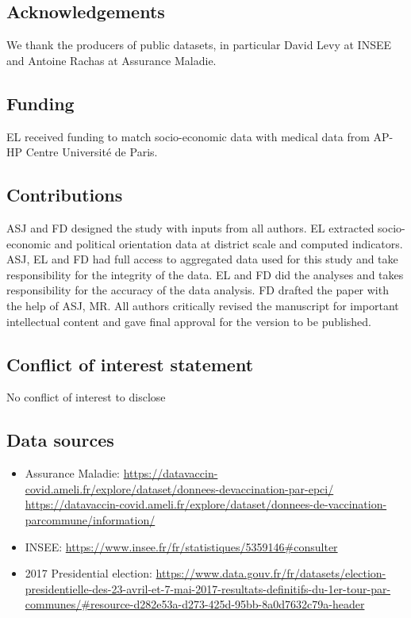 \documentclass[
]{article}
\providecommand{\tightlist}{%
  \setlength{\itemsep}{0pt}\setlength{\parskip}{0pt}}
\begin{document}
\hypertarget{acknowledgements}{%
\subsection{Acknowledgements}\label{acknowledgements}}

We thank the producers of public datasets, in particular David Levy at INSEE and Antoine Rachas at Assurance Maladie.

\hypertarget{funding}{%
\subsection{Funding}\label{funding}}

EL received funding to match socio-economic data with medical data from AP-HP Centre Université de Paris.

\hypertarget{contributions}{%
\subsection{Contributions}\label{contributions}}

ASJ and FD designed the study with inputs from all authors. EL extracted socio-economic and political orientation data at district scale and computed indicators. ASJ, EL and FD had full access to aggregated data used for this study and take responsibility for the integrity of the data. EL and FD did the analyses and takes responsibility for the accuracy of the data analysis. FD drafted the paper with the help of ASJ, MR. All authors critically revised the manuscript for important intellectual content and gave final approval for the version to be published.

\hypertarget{conflict-of-interest-statement}{%
\subsection{Conflict of interest statement}\label{conflict-of-interest-statement}}

No conflict of interest to disclose

\hypertarget{data-sources}{%
\subsection{Data sources}\label{data-sources}}

\begin{itemize}
\tightlist
\item
  Assurance Maladie: \url{https://datavaccin-covid.ameli.fr/explore/dataset/donnees-devaccination-par-epci/} \url{https://datavaccin-covid.ameli.fr/explore/dataset/donnees-de-vaccination-parcommune/information/}
\item
  INSEE: \url{https://www.insee.fr/fr/statistiques/5359146\#consulter}
\item
  2017 Presidential election: \url{https://www.data.gouv.fr/fr/datasets/election-presidentielle-des-23-avril-et-7-mai-2017-resultats-definitifs-du-1er-tour-par-communes/\#resource-d282e53a-d273-425d-95bb-8a0d7632c79a-header}
\end{itemize}
\end{document}

